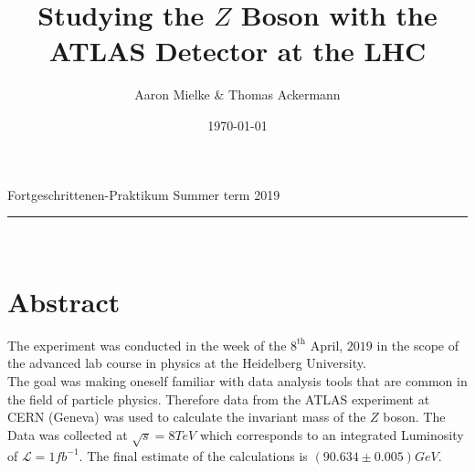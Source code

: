 \documentclass[12pt, a4paper, bibliography=totoc]{scrartcl}
\title{Studying the $Z$ Boson with the ATLAS Detector at the LHC}
\author{Aaron Mielke \& Thomas Ackermann}
\date{\today}
\begin{document}
\begin{center}
	\makeatletter
	\thispagestyle{empty}
	\large{Fortgeschrittenen-Praktikum}
\hfill
	 \vspace{-5mm}
    \large{Summer term 2019} 
    \rule{\textwidth}{0.2pt}
    \Huge\textbf{\@title} \\
	\large{\@author}
	\makeatother
\end{center}
\section*{Abstract}
The experiment was conducted in the week of the $8^\text{th}$ April, $2019$ in the scope of the advanced lab course in physics at the Heidelberg University. \\
The goal was making oneself familiar with data analysis tools that are common in the field of particle physics.
Therefore data from the ATLAS experiment at CERN (Geneva) was used to calculate the invariant mass of the $Z$ boson.
The Data was collected at $\sqrt{s} = 8 \si{TeV}$ which corresponds to an integrated Luminosity of $\mathcal{L} = 1 \si{fb^{-1}}$.
The final estimate of the calculations is $(90.634 \pm 0.005 )\si{GeV}$.
\tableofcontents
\newpage
\end{document}
